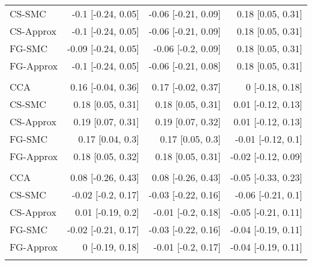\documentclass[
  12pt,
  a4paper,
]{article}
\begin{document}
\begin{longtable}[t]{lrrr}
\hspace{1em}CS-SMC & -0.1 [-0.24, 0.05] & -0.06 [-0.21, 0.09] & 0.18 [0.05, 0.31]\\
\hspace{1em}CS-Approx & -0.1 [-0.24, 0.05] & -0.06 [-0.21, 0.09] & 0.18 [0.05, 0.31]\\
\hspace{1em}FG-SMC & -0.09 [-0.24, 0.05] & -0.06 [-0.2, 0.09] & 0.18 [0.05, 0.31]\\
\hspace{1em}FG-Approx & -0.1 [-0.24, 0.05] & -0.06 [-0.21, 0.08] & 0.18 [0.05, 0.31]\\
\addlinespace[0.3em]
\multicolumn{4}{l}{\textbf{PB Blasts (per $5$\%)}}\\
\hspace{1em}CCA & 0.16 [-0.04, 0.36] & 0.17 [-0.02, 0.37] & 0 [-0.18, 0.18]\\
\hspace{1em}CS-SMC & 0.18 [0.05, 0.31] & 0.18 [0.05, 0.31] & 0.01 [-0.12, 0.13]\\
\hspace{1em}CS-Approx & 0.19 [0.07, 0.31] & 0.19 [0.07, 0.32] & 0.01 [-0.12, 0.13]\\
\hspace{1em}FG-SMC & 0.17 [0.04, 0.3] & 0.17 [0.05, 0.3] & -0.01 [-0.12, 0.1]\\
\hspace{1em}FG-Approx & 0.18 [0.05, 0.32] & 0.18 [0.05, 0.31] & -0.02 [-0.12, 0.09]\\
\addlinespace[0.3em]
\multicolumn{4}{l}{\textbf{Ruxolitinib given: yes}}\\
\hspace{1em}CCA & 0.08 [-0.26, 0.43] & 0.08 [-0.26, 0.43] & -0.05 [-0.33, 0.23]\\
\hspace{1em}CS-SMC & -0.02 [-0.2, 0.17] & -0.03 [-0.22, 0.16] & -0.06 [-0.21, 0.1]\\
\hspace{1em}CS-Approx & 0.01 [-0.19, 0.2] & -0.01 [-0.2, 0.18] & -0.05 [-0.21, 0.11]\\
\hspace{1em}FG-SMC & -0.02 [-0.21, 0.17] & -0.03 [-0.22, 0.16] & -0.04 [-0.19, 0.11]\\
\hspace{1em}FG-Approx & 0 [-0.19, 0.18] & -0.01 [-0.2, 0.17] & -0.04 [-0.19, 0.11]\\
\addlinespace[0.3em]
\multicolumn{4}{l}{\textbf{T-cell depletion: yes}}\\

\end{longtable}
\end{document}
